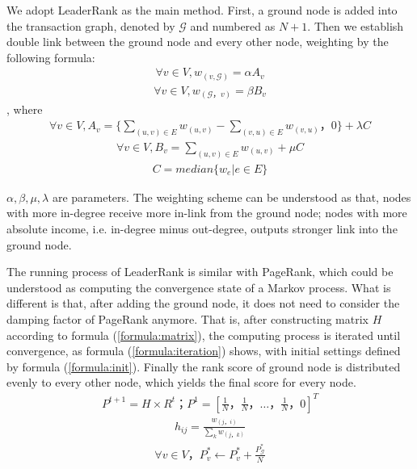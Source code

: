 We adopt LeaderRank\cite{Chen2013}\cite{Li2014} as the main method. First, a ground node is added into the transaction graph, denoted by $\mathcal{G}$ and numbered as $N+1$. Then we establish double link between the ground node and every other node, weighting by the following formula:
\begin{align}\label{formula:weight1}
	\forall v \in V, w_{(v, \mathcal{G})} = \alpha A_v
\end{align}
\begin{align}\label{formula:weight2}
\forall v \in V,  w_{(\mathcal{G}， v)} = \beta B_v
\end{align}
, where 
\begin{align}
	\forall v \in V, A_v = \{ \sum_{(u,v)\in E} w_{(u,v)} - \sum_{(v,u) \in E} w_{(v, u)}， 0 \} + \lambda C
\end{align}
\begin{align} \label{formula:b}
\forall v \in V,  B_v =  \sum_{(u,v) \in E} w_{(u,v)} + \mu C
\end{align}
\begin{align}
	C = median\{w_e| e \in E\}
\end{align}

$\alpha, \beta, \mu, \lambda$ are parameters. The weighting scheme can be understood as that, nodes with more in-degree receive more in-link from the ground node; nodes with more absolute income, i.e. in-degree minus out-degree, outputs stronger link into the ground node. 

The running process of LeaderRank is similar with PageRank, which could be understood as computing the convergence state of a Markov process. What is different is that, after adding the ground node, it does not need to consider the damping factor of PageRank\cite{Brin2010}\cite{page1999pagerank} anymore. That is, after constructing matrix $H$ according to formula (\ref{formula:matrix}), the computing process is iterated until convergence, as formula (\ref{formula:iteration}) shows, with initial settings defined by formula (\ref{formula:init}). Finally the rank score of ground node is distributed evenly to every other node, which yields the final score for every node.
\begin{align} \label{formula:iteration}
	P^{t+1} = H \times R^{t}； P^1=[\frac{1}{N}， \frac{1}{N}， \dots， \frac{1}{N}， 0]^T
\end{align}
\begin{align} \label{formula:matrix}
	h_{ij} = \frac{w_{(j，i)}}{\sum_k w_{(j，k)}}
\end{align}
\begin{align} \label{formula:init}
\forall v \in V， P^*_v \leftarrow P^*_v + \frac{P^*_{\mathcal{G}}}{N}
\end{align}

